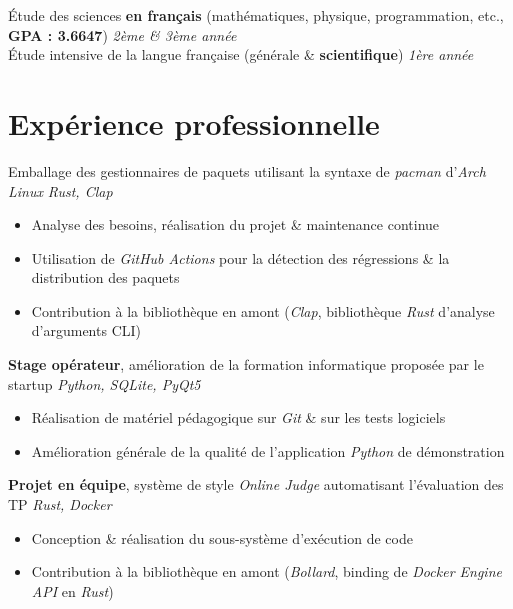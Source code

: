 \documentclass{resume}
\begin{document}
Étude des sciences \textbf{en français} {\footnotesize (mathématiques, physique, programmation, etc., \textbf{GPA : 3.6647})} \hfill \textit{2ème \& 3ème année} \\
Étude intensive de la langue française (générale \& \textbf{scientifique}) \hfill \textit{1ère année}



\section{Expérience professionnelle}

Emballage des gestionnaires de paquets utilisant la syntaxe de \textit{pacman} d'\textit{Arch Linux} \hfill \textit{Rust, Clap}
\begin{itemize}
  \item Analyse des besoins, réalisation du projet \& maintenance continue
  \item Utilisation de \textit{GitHub Actions} pour la détection des régressions \& la distribution des paquets
  \item Contribution à la bibliothèque en amont (\textit{Clap}, bibliothèque \textit{Rust} d'analyse d'arguments CLI)
\end{itemize}

\textbf{Stage opérateur}, amélioration de la formation informatique proposée par le startup \hfill \textit{Python, SQLite, PyQt5}
\begin{itemize}
  \item Réalisation de matériel pédagogique sur \textit{Git} \& sur les tests logiciels
  \item Amélioration générale de la qualité de l'application \textit{Python} de démonstration
\end{itemize}

\textbf{Projet en équipe}, système de style \textit{Online Judge} automatisant l'évaluation des TP \hfill \textit{Rust, Docker}
\begin{itemize}
  \item Conception \& réalisation du sous-système d'exécution de code
  \item Contribution à la bibliothèque en amont (\textit{Bollard}, binding de \textit{Docker Engine API} en \textit{Rust})
\end{itemize}
\end{document}
